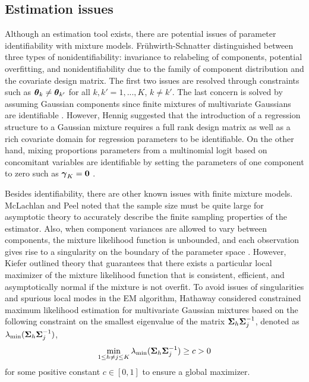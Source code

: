 \subsection{Estimation issues}
Although an estimation tool exists, there are potential issues of parameter identifiability with mixture models. Fr{\"u}hwirth-Schnatter \cite{fruhwirth2006} distinguished between three types of nonidentifiability: invariance to  relabeling of components, potential overfitting, and nonidentifiability due to the family of component distribution and the covariate design matrix. The first two issues are resolved through constraints such as $\boldsymbol\theta_{k}\not=\boldsymbol\theta_{k'}$ for all $k,k'=1,...,K$, $k\not=k'$. The last concern is solved by assuming Gaussian components since finite mixtures of multivariate Gaussians are identifiable \cite{teicher1963,yakowitz1968}. However, Hennig \cite{hennig2000} suggested that the introduction of a regression structure to a Gaussian mixture requires a full rank design matrix as well as a rich covariate domain for regression parameters to be identifiable. On the other hand, mixing proportions parameters from a multinomial logit based on concomitant variables are identifiable by setting the parameters of one component to zero such as $\boldsymbol\gamma_{K}=\boldsymbol0$ \cite{jiang1999}.

Besides identifiability, there are other known issues with finite mixture models. McLachlan and Peel \cite{mclachlan2000} noted that the sample size must be quite large for asymptotic theory to accurately describe the finite sampling properties of the estimator. Also, when component variances are allowed to vary between components, the mixture likelihood function is unbounded, and each observation gives rise to a singularity on the boundary of the parameter space \cite{day1969,kiefer1956}. However, Kiefer \cite{kiefer1978} outlined theory that guarantees that there exists a particular local maximizer of the mixture likelihood function that is consistent, efficient, and asymptotically normal if the mixture is not overfit. To avoid issues of singularities and spurious local modes in the EM algorithm, Hathaway \cite{hathaway1985} considered constrained maximum likelihood estimation for multivariate Gaussian mixtures based on the following constraint on the smallest eigenvalue of the matrix $\boldsymbol\Sigma_{h}\boldsymbol\Sigma_{j}^{-1}$, denoted as $\lambda_{\text{min}}(\boldsymbol\Sigma_{h}\boldsymbol\Sigma_{j}^{-1})$,
$$\min_{1\leq h\not=j\leq K}\lambda_{\text{min}}(\boldsymbol\Sigma_{h}\boldsymbol\Sigma_{j}^{-1})\geq c > 0$$ for some positive constant $c\in[0,1]$ to ensure a global maximizer. 

